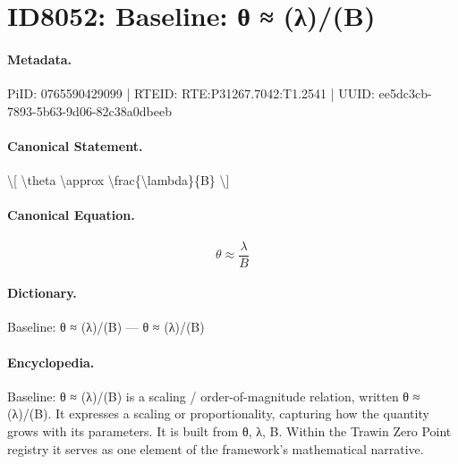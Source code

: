 \section*{ID8052: Baseline: θ ≈ (λ)/(B)}
\paragraph{Metadata.}
PiID: 0765590429099 | RTEID: RTE:P31267.7042:T1.2541 | UUID: ee5dc3cb-7893-5b63-9d06-82c38a0dbeeb

\paragraph{Canonical Statement.}
\textbackslash{}[ \textbackslash{}theta \textbackslash{}approx \textbackslash{}frac\{\textbackslash{}lambda\}\{B\} \textbackslash{}]

\paragraph{Canonical Equation.}
\[
\theta \approx \frac{\lambda}{B}
\]

\paragraph{Dictionary.}
Baseline: θ ≈ (λ)/(B) — θ ≈ (λ)/(B)

\paragraph{Encyclopedia.}
Baseline: θ ≈ (λ)/(B) is a scaling / order-of-magnitude relation, written θ ≈ (λ)/(B). It expresses a scaling or proportionality, capturing how the quantity grows with its parameters. It is built from θ, λ, B. Within the Trawin Zero Point registry it serves as one element of the framework's mathematical narrative.
